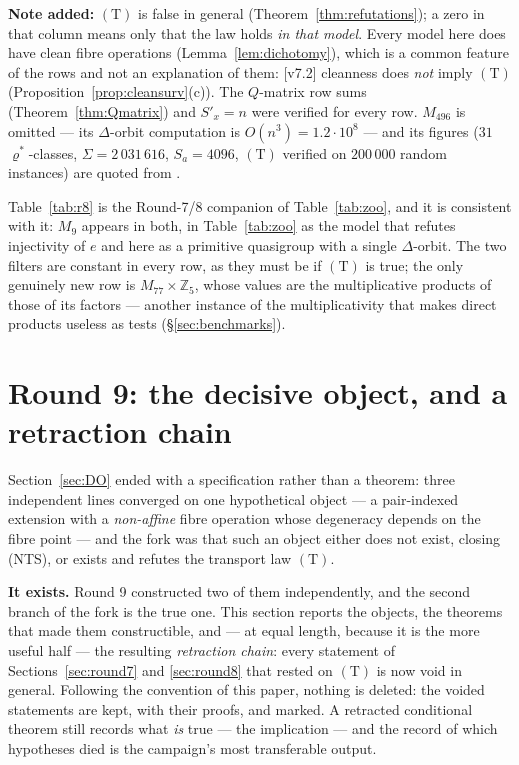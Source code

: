 \documentclass[11pt]{article}
\theoremstyle{plain}
\theoremstyle{definition}
\theoremstyle{remark}
\numberwithin{equation}{section}
\newcommand{\Z}{\mathbb{Z}}
\begin{document}
\begin{table}[htbp]
{\textbf{Note added:} $(\mathrm{T})$ is false in general
(Theorem~\ref{thm:refutations}); a zero in that column means only that the law
holds \emph{in that model}. Every model here does have clean fibre operations
(Lemma~\ref{lem:dichotomy}), which is a common feature of the rows and not an
explanation of them: [v7.2] cleanness does \emph{not} imply $(\mathrm{T})$
(Proposition~\ref{prop:cleansurv}(c)). The
$Q$-matrix row sums (Theorem~\ref{thm:Qmatrix}) and $S'_x = n$ were verified for
every row. $M_{496}$ is omitted --- its $\Delta$-orbit computation is
$O(n^3) = 1.2\cdot10^8$ --- and its figures ($31$ $\varrho^{*}$-classes,
$\Sigma = 2\,031\,616$, $S_a = 4096$, $(\mathrm{T})$ verified on $200\,000$ random
instances) are quoted from \cite{R8A}.}
\label{tab:r8}
\end{table}

Table~\ref{tab:r8} is the Round-7/8 companion of Table~\ref{tab:zoo}, and it is
consistent with it: $M_9$ appears in both, in Table~\ref{tab:zoo} as the model
that refutes injectivity of $e$ and here as a primitive quasigroup with a single
$\Delta$-orbit. The two filters are constant in every row, as they must be if
$(\mathrm{T})$ is true; the only genuinely new row is $M_{77}\times\Z_5$, whose
values are the multiplicative products of those of its factors --- another
instance of the multiplicativity that makes direct products useless as tests
(\S\ref{sec:benchmarks}).

\section{Round 9: the decisive object, and a retraction chain}\label{sec:round9}

Section~\ref{sec:DO} ended with a specification rather than a theorem: three
independent lines converged on one hypothetical object --- a pair-indexed
extension with a \emph{non-affine} fibre operation whose degeneracy depends on
the fibre point --- and the fork was that such an object either does not exist,
closing (NTS), or exists and refutes the transport law $(\mathrm{T})$.

\textbf{It exists.} Round 9 \cite{R9A} constructed two of them independently, and
the second branch of the fork is the true one. This section reports the objects,
the theorems that made them constructible, and --- at equal length, because it is
the more useful half --- the resulting \emph{retraction chain}: every statement of
Sections~\ref{sec:round7} and \ref{sec:round8} that rested on $(\mathrm{T})$ is
now void in general. Following the convention of this paper, nothing is deleted:
the voided statements are kept, with their proofs, and marked. A retracted
conditional theorem still records what \emph{is} true --- the implication --- and
the record of which hypotheses died is the campaign's most transferable output.
\end{document}
